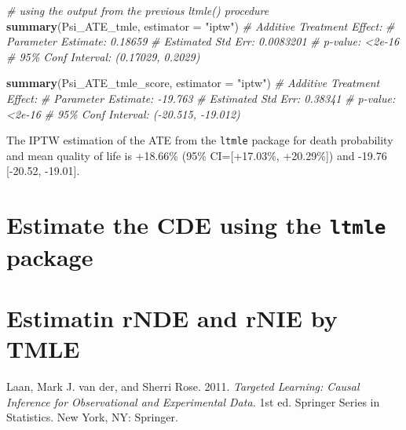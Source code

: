 \documentclass[
]{book}
\newenvironment{Shaded}{\begin{snugshade}}{\end{snugshade}}
\newcommand{\AttributeTok}[1]{\textcolor[rgb]{0.13,0.29,0.53}{#1}}
\newcommand{\CommentTok}[1]{\textcolor[rgb]{0.56,0.35,0.01}{\textit{#1}}}
\newcommand{\FunctionTok}[1]{\textcolor[rgb]{0.13,0.29,0.53}{\textbf{#1}}}
\newcommand{\NormalTok}[1]{#1}
\newcommand{\StringTok}[1]{\textcolor[rgb]{0.31,0.60,0.02}{#1}}
\newlength{\cslhangindent}
\newenvironment{CSLReferences}[2] %
 {\begin{list}{}{%
  \setlength{\itemindent}{0pt}
  \setlength{\leftmargin}{0pt}
  \setlength{\parsep}{0pt}
  \ifodd #1
   \setlength{\leftmargin}{\cslhangindent}
   \setlength{\itemindent}{-1\cslhangindent}
  \fi
  \setlength{\itemsep}{#2\baselineskip}}}
 {\end{list}}
\begin{document}
\begin{Shaded}
\begin{Highlighting}[]
\CommentTok{\# using the output from the previous ltmle() procedure}
\FunctionTok{summary}\NormalTok{(Psi\_ATE\_tmle, }\AttributeTok{estimator =} \StringTok{"iptw"}\NormalTok{)}
\CommentTok{\# Additive Treatment Effect:}
\CommentTok{\#    Parameter Estimate:  0.18659 }
\CommentTok{\#     Estimated Std Err:  0.0083201 }
\CommentTok{\#               p{-}value:  \textless{}2e{-}16 }
\CommentTok{\#     95\% Conf Interval: (0.17029, 0.2029) }

\FunctionTok{summary}\NormalTok{(Psi\_ATE\_tmle\_score, }\AttributeTok{estimator =} \StringTok{"iptw"}\NormalTok{)}
\CommentTok{\# Additive Treatment Effect:}
\CommentTok{\#    Parameter Estimate:  {-}19.763 }
\CommentTok{\#     Estimated Std Err:  0.38341 }
\CommentTok{\#               p{-}value:  \textless{}2e{-}16 }
\CommentTok{\#     95\% Conf Interval: ({-}20.515, {-}19.012) }
\end{Highlighting}
\end{Shaded}

The IPTW estimation of the ATE from the \texttt{ltmle} package for death probability and mean quality of life is +18.66\% (95\% CI={[}+17.03\%, +20.29\%{]}) and -19.76 {[}-20.52, -19.01{]}.

\chapter{\texorpdfstring{Estimate the CDE using the \texttt{ltmle} package}{Estimate the CDE using the ltmle package}}\label{estimate-the-cde-using-the-ltmle-package}

\chapter{Estimatin rNDE and rNIE by TMLE}\label{estimatin-rnde-and-rnie-by-tmle}

\label{refs}
\begin{CSLReferences}{1}{0}
Laan, Mark J. van der, and Sherri Rose. 2011. \emph{Targeted Learning: Causal Inference for Observational and Experimental Data.} 1st ed. Springer Series in Statistics. New York, NY: Springer.

\end{CSLReferences}
\end{document}
